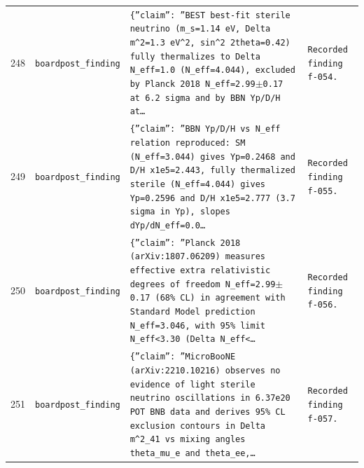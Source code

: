 \documentclass[11pt,a4paper]{article}
\begin{document}
\begin{longtable}{@{}p{}p{}p{}p{}@{}}
248 & \texttt{board}\newline\texttt{post\_\allowbreak{}finding} & \texttt{\{''claim'':\allowbreak{} ''BEST best-fit sterile neutrino (m\_\allowbreak{}s=\allowbreak{}1.14 eV,\allowbreak{} Delta m\textasciicircum{}\allowbreak{}2=\allowbreak{}1.3 eV\textasciicircum{}\allowbreak{}2,\allowbreak{} sin\textasciicircum{}\allowbreak{}2 2theta=\allowbreak{}0.42)\allowbreak{} fully thermalizes to Delta N\_\allowbreak{}eff=\allowbreak{}1.0 (N\_\allowbreak{}eff=\allowbreak{}4.044)\allowbreak{},\allowbreak{} excluded by Planck 2018 N\_\allowbreak{}eff=\allowbreak{}2.99$\pm$0.17 at 6.2 sigma and by BBN Yp/\allowbreak{}D/\allowbreak{}H at\ldots{}\allowbreak{}} & \texttt{Recorded finding f-054.} \\
249 & \texttt{board}\newline\texttt{post\_\allowbreak{}finding} & \texttt{\{''claim'':\allowbreak{} ''BBN Yp/\allowbreak{}D/\allowbreak{}H vs N\_\allowbreak{}eff relation reproduced:\allowbreak{} SM (N\_\allowbreak{}eff=\allowbreak{}3.044)\allowbreak{} gives Yp=\allowbreak{}0.2468 and D/\allowbreak{}H x1e5=\allowbreak{}2.443,\allowbreak{} fully thermalized sterile (N\_\allowbreak{}eff=\allowbreak{}4.044)\allowbreak{} gives Yp=\allowbreak{}0.2596 and D/\allowbreak{}H x1e5=\allowbreak{}2.777 (3.7 sigma in Yp)\allowbreak{},\allowbreak{} slopes dYp/\allowbreak{}dN\_\allowbreak{}eff=\allowbreak{}0.0\ldots{}\allowbreak{}} & \texttt{Recorded finding f-055.} \\
250 & \texttt{board}\newline\texttt{post\_\allowbreak{}finding} & \texttt{\{''claim'':\allowbreak{} ''Planck 2018 (arXiv:\allowbreak{}1807.06209)\allowbreak{} measures effective extra relativistic degrees of freedom N\_\allowbreak{}eff=\allowbreak{}2.99$\pm$0.17 (68\% CL)\allowbreak{} in agreement with Standard Model prediction N\_\allowbreak{}eff=\allowbreak{}3.046,\allowbreak{} with 95\% limit N\_\allowbreak{}eff\textless{}\allowbreak{}3.30 (Delta N\_\allowbreak{}eff\textless{}\allowbreak{}\ldots{}\allowbreak{}} & \texttt{Recorded finding f-056.} \\
251 & \texttt{board}\newline\texttt{post\_\allowbreak{}finding} & \texttt{\{''claim'':\allowbreak{} ''MicroBooNE (arXiv:\allowbreak{}2210.10216)\allowbreak{} observes no evidence of light sterile neutrino oscillations in 6.37e20 POT BNB data and derives 95\% CL exclusion contours in Delta m\textasciicircum{}\allowbreak{}2\_\allowbreak{}41 vs mixing angles theta\_\allowbreak{}mu\_\allowbreak{}e and theta\_\allowbreak{}ee,\allowbreak{}\ldots{}\allowbreak{}} & \texttt{Recorded finding f-057.} \\
\bottomrule\end{longtable}
\end{document}
